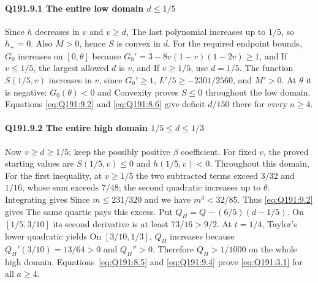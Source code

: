 \paragraph{Q191.9.1 The entire low domain $d\le\allowbreak 1/5$}
Since $h$ decreases in $v$ and $v\ge\allowbreak  d$,
The last polynomial increases up to $1/5$, so $h_+=\allowbreak 0$.
Also $M>\allowbreak 0$, hence $S$ is convex in $d$. For the required endpoint bounds,
$G_0$ increases on $[0,\allowbreak \theta]$ because
$G_0'=\allowbreak 3-8v(1-v)(1-2v)\ge\allowbreak 1$, and
If $v\le\allowbreak 1/5$, the largest allowed $d$ is $v$, and
If $v\ge\allowbreak 1/5$, use $d=\allowbreak 1/5$. The function $S(1/5,\allowbreak v)$ increases in $v$,
since $G_0'\ge\allowbreak 1$, $L'/5\ge\allowbreak -2301/2560$, and $M'>\allowbreak 0$. At $\theta$
it is negative: $G_0(\theta)<\allowbreak 0$ and
Convexity proves $S\le\allowbreak 0$ throughout the low domain. Equations
\eqref{eq:Q191:9.2} and \eqref{eq:Q191:8.6} give deficit $d/150$
there for every $a\ge\allowbreak 4$.

\paragraph{Q191.9.2 The entire high domain $1/5\le\allowbreak  d\le\allowbreak 1/3$}
Now $v\ge\allowbreak  d\ge\allowbreak 1/5$; keep the possibly positive $\beta$ coefficient.
For fixed $v$, the proved starting values are
$S(1/5,\allowbreak v)\le\allowbreak 0$ and $h(1/5,\allowbreak v)<\allowbreak 0$. Throughout this domain,
For the first inequality, at $v\ge\allowbreak 1/5$ the two subtracted terms exceed
$3/32$ and $1/16$, whose sum exceeds $7/48$; the second quadratic
increases up to $\theta$. Integrating gives
Since $m\le\allowbreak 231/320$ and
we have $m^3<\allowbreak 32/85$. Thus \eqref{eq:Q191:9.2} gives
The same quartic pays this excess. Put $Q_H=\allowbreak Q-(6/5)(d-1/5)$.
On $[1/5,\allowbreak 3/10]$ its second derivative is at least $73/16>\allowbreak 9/2$.
At $t=\allowbreak 1/4$,
Taylor's lower quadratic yields
On $[3/10,\allowbreak 1/3]$, $Q_H$ increases because $Q_H'(3/10)=\allowbreak 13/64>\allowbreak 0$ and
$Q_H''>\allowbreak 0$. Therefore $Q_H>\allowbreak 1/1000$ on the whole high domain.
Equations~\eqref{eq:Q191:8.5} and \eqref{eq:Q191:9.4} prove
\eqref{eq:Q191:3.1} for all $a\ge\allowbreak 4$.

